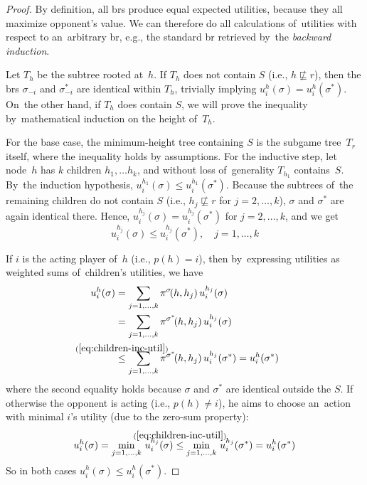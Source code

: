 \begin{proof}
  By definition, all \acrlong{br}s produce equal expected utilities, because they all maximize opponent's value.
  We can therefore do all calculations of~utilities with respect to an~arbitrary \acrlong{br}, e.g., the standard \acrshort{br} retrieved by~the \emph{backward induction}\footnotemark.

  Let $T_h$ be the subtree rooted at~$h$.
  If $T_h$ does not contain $S$ (i.e., $h \not\sqsubseteq r$), then the \acrlong{br}s $\sigma_{-i}$ and $\sigma^*_{-i}$ are identical within $T_h$, trivially implying $u_i^h (\sigma) = u_i^h (\sigma^*)$.
  On~the other hand, if $T_h$ does contain $S$, we will prove the inequality by~mathematical induction on the height of~$T_h$.

  For the base case, the minimum-height tree containing $S$ is the subgame tree~$T_r$ itself, where the inequality holds by assumptions.
  For the inductive step, let node~$h$ has $k$ children $h_1, \dots h_k$, and without loss of~generality $T_{h_1}$ contains~$S$.
  By~the induction hypothesis, $u_i^{h_1} (\sigma) \le u_i^{h_1} (\sigma^*)$.
  Because the subtrees of~the remaining children do not contain $S$ (i.e., $h_j \not\sqsubseteq r$ for $j = 2, \dots, k$), $\sigma$ and $\sigma^*$ are again identical there.
  Hence, $u_i^{h_j} (\sigma) = u_i^{h_j} (\sigma^*)$ for $j = 2, \dots, k$, and we get
  \begin{equation}
    \label{eq:children-inc-util}
    u_i^{h_j}(\sigma) \le u_i^{h_j}(\sigma^*), \quad j = 1, \dots, k
  \end{equation}

  If $i$ is the acting player of~$h$ (i.e., $p(h) = i$), then by~expressing utilities as weighted sums of~children's utilities, we have
  \begin{align*}
    u_i^h(\sigma)
    &= \sum _{j = 1, \dots, k} \pi^\sigma\!(h,h_j) \,u_i^{h_j}(\sigma)
    \\
    &= \sum _{j = 1, \dots, k} \pi^{\sigma^*}\!(h,h_j) \,u_i^{h_j}(\sigma)
    \\
    &\stackrel{\mathclap{\mathrm{(\ref{eq:children-inc-util})}}} {\le}
    \sum _{j = 1, \dots, k} \pi^{\sigma^*}\!(h,h_j) \,u_i^{h_j}(\sigma^*)
    = u_i^h(\sigma^*)
  \end{align*}
  where the second equality holds because $\sigma$ and $\sigma^*$ are identical outside the $S$.
  If otherwise the opponent is acting (i.e., $p(h) \ne i$), he aims to choose an~action with minimal $i$'s utility (due to the zero-sum property):
  \begin{align*}
    u_i^h(\sigma)
    = \min _{j = 1, \dots, k} \,u_i^{h_j}(\sigma)
    \stackrel{\mathclap{\mathrm{(\ref{eq:children-inc-util})}}} {\le}
    \min _{j = 1, \dots, k} \,u_i^{h_j}(\sigma^*)
    = u_i^h(\sigma^*)
  \end{align*}
  So in both cases $u_i^h(\sigma) \le u_i^h(\sigma^*)$.
\end{proof}


